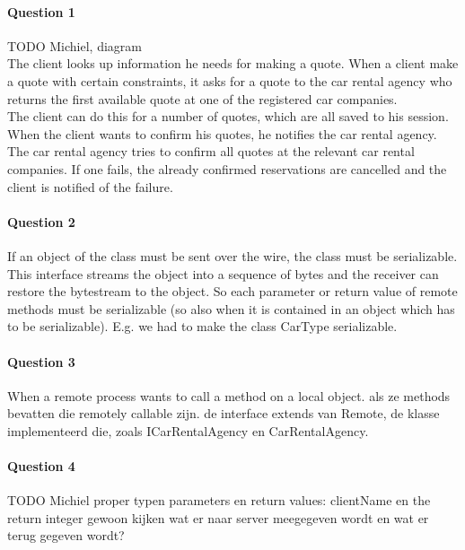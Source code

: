 \documentclass{ds-report}
\begin{document}
	\maketitle

	\paragraph{Question 1} 
	TODO Michiel, diagram 
	\\
	The client looks up information he needs for making a quote. When a client make a quote with certain constraints, it asks for a quote to the car rental agency who returns the first available quote at one of the registered car companies. \\
	The client can do this for a number of quotes, which are all saved to his session. When the client wants to confirm his quotes, he notifies the car rental agency. The car rental agency tries to confirm all quotes at the relevant car rental companies. If one fails, the already confirmed reservations are cancelled and the client is notified of the failure.
	
	
	\paragraph{Question 2}
	If an object of the class must be sent over the wire, the class must be serializable. This interface streams the object into a sequence of bytes and the receiver can restore the bytestream to the object. So each parameter or return value of remote methods must be serializable  (so also when it is contained in an object which has to be serializable). E.g. we had to make the class CarType serializable. 
	
	
	\paragraph{Question 3} 
	When a remote process wants to call a method on a local object. 
	als ze methods bevatten die remotely callable zijn. de interface extends van Remote, de klasse implementeerd die, zoals ICarRentalAgency en CarRentalAgency.
	
	\paragraph{Question 4} TODO Michiel proper typen
	parameters en return values: clientName en the return integer
	gewoon kijken wat er naar server meegegeven wordt en wat er terug gegeven wordt?
	
\end{document}
